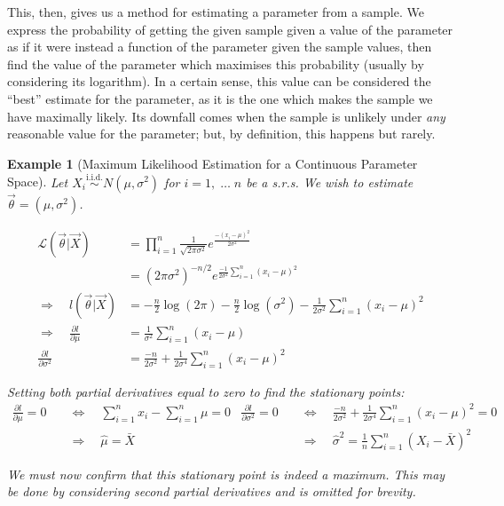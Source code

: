 \documentclass[12pt,a4paper]{article}
\newtheorem{ex}[thm]{Example}
\begin{document}
This, then, gives us a method for estimating a parameter from a sample. We express the probability of getting the given sample given a value of the parameter as if it were instead a function of the parameter given the sample values, then find the value of the parameter which maximises this probability (usually by considering its logarithm). In a certain sense, this value can be considered the ``best'' estimate for the parameter, as it is the one which makes the sample we have maximally likely. Its downfall comes when the sample is unlikely under \emph{any} reasonable value for the parameter; but, by definition, this happens but rarely.

\begin{ex}[Maximum Likelihood Estimation for a Continuous Parameter Space]\vspace{1cm}

Let $X_i \overset{\text{i.i.d.}}{\sim} N(\mu, \sigma^2)$ for $i = 1,\;\hdots\; n$ be a s.r.s. We wish to estimate $\vec{\theta} = (\mu,\sigma^2)$.

\begin{align*}
\mathcal{L}(\vec{\theta}|\vec{X}) &= \prod_{i=1}^n \frac{1}{\sqrt{2 \pi \sigma^2}} e^{\frac{-(x_i - \mu)^2}{2\sigma^2}}\\
&= (2\pi\sigma^2)^{-n/2} e^{\frac{-1}{2\sigma^2} \sum\limits_{i=1}^n (x_i - \mu)^2}\\
\Rightarrow \quad l(\vec{\theta}|\vec{X}) &= -\frac{n}{2}\log(2\pi) - \frac{n}{2}\log(\sigma^2) - \frac{1}{2\sigma^2} \sum_{i=1}^n (x_i - \mu)^2\\
\Rightarrow\quad \frac{\partial l}{\partial \mu} &= \frac{1}{\sigma^2}\sum_{i=1}^n(x_i - \mu)\\
\frac{\partial l}{\partial \sigma^2} &= \frac{-n}{2\sigma^2} + \frac{1}{2\sigma^4}\sum_{i=1}^n(x_i - \mu)^2
\end{align*}

\noindent Setting both partial derivatives equal to zero to find the stationary points:
\begin{align*}
\frac{\partial l}{\partial \mu} = 0 \quad&\Leftrightarrow\quad \sum_{i=1}^n x_i - \sum_{i=1}^n \mu = 0 & \frac{\partial l}{\partial \sigma^2} = 0 \quad&\Leftrightarrow\quad \frac{-n}{2\sigma^2} + \frac{1}{2\sigma^4}\sum_{i=1}^n (x_i - \mu)^2 = 0\\
&\Rightarrow\quad \hat{\mu} = \bar{X} & &\Rightarrow\quad \hat{\sigma}^2 = \frac{1}{n} \sum_{i=1}^n (X_i - \bar{X})^2
\end{align*}

We must now confirm that this stationary point is indeed a maximum. This may be done by considering second partial derivatives and is omitted for brevity.

\end{ex}
\end{document}

